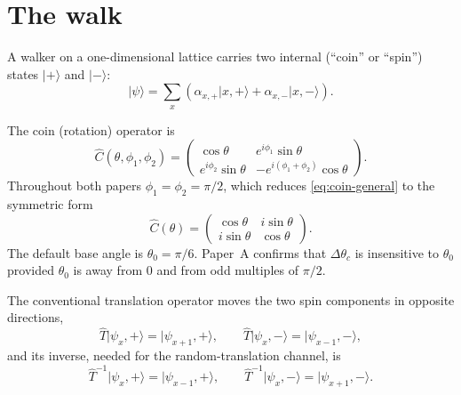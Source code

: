 \documentclass[11pt]{article}
\newcommand{\dthetac}{\Delta\theta_{c}}             %
\newcommand{\Cop}{\hat{C}}                          %
\newcommand{\Top}{\hat{T}}                          %
\newcommand{\Tinv}{\hat{T}^{-1}}                    %
\newcommand{\ket}[1]{\lvert #1 \rangle}
\begin{document}
\section{The walk}
\label{sec:walk}

A walker on a one-dimensional lattice carries two internal (``coin'' or
``spin'') states $\ket{+}$ and $\ket{-}$:
\begin{equation}
\ket{\psi} = \sum_{x}\left( \alpha_{x,+}\ket{x,+} + \alpha_{x,-}\ket{x,-} \right).
\label{eq:state}
\end{equation}

The coin (rotation) operator is
\begin{equation}
\Cop(\theta,\phi_1,\phi_2) =
\begin{pmatrix}
\cos\theta & e^{i\phi_1}\sin\theta \\[2pt]
e^{i\phi_2}\sin\theta & -e^{i(\phi_1+\phi_2)}\cos\theta
\end{pmatrix}.
\label{eq:coin-general}
\end{equation}
Throughout both papers $\phi_1 = \phi_2 = \pi/2$, which reduces
\eqref{eq:coin-general} to the symmetric form
\begin{equation}
\Cop(\theta) =
\begin{pmatrix}
\cos\theta & i\sin\theta \\[2pt]
i\sin\theta & \cos\theta
\end{pmatrix}.
\label{eq:coin}
\end{equation}
The default base angle is $\theta_0 = \pi/6$. Paper~A confirms that
$\dthetac$ is insensitive to $\theta_0$ provided $\theta_0$ is away from $0$
and from odd multiples of $\pi/2$.

The conventional translation operator moves the two spin components in
opposite directions,
\begin{equation}
\Top\ket{\psi_x,+} = \ket{\psi_{x+1},+},
\qquad
\Top\ket{\psi_x,-} = \ket{\psi_{x-1},-},
\label{eq:translation}
\end{equation}
and its inverse, needed for the random-translation channel, is
\begin{equation}
\Tinv\ket{\psi_x,+} = \ket{\psi_{x-1},+},
\qquad
\Tinv\ket{\psi_x,-} = \ket{\psi_{x+1},-}.
\label{eq:translation-inverse}
\end{equation}
\end{document}

